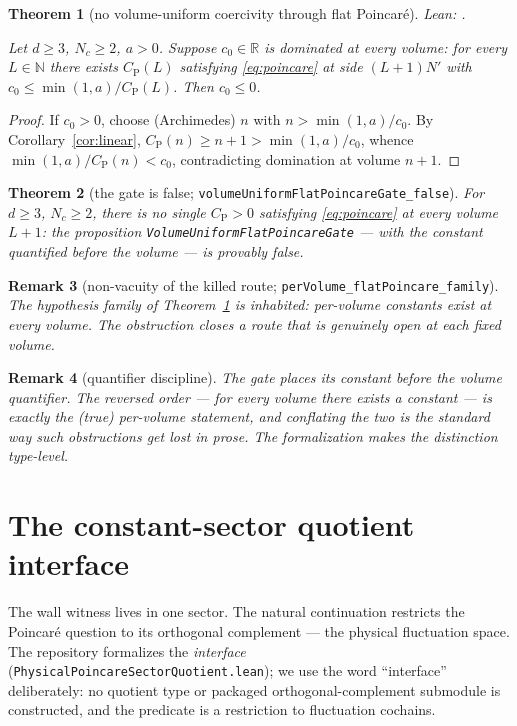 \documentclass[11pt]{article}
\newtheorem{theorem}{Theorem}[section]
\newtheorem{remark}[theorem]{Remark}
\theoremstyle{definition}
\newcommand{\lean}[1]{\texttt{#1}}
\newcommand{\R}{\mathbb{R}}
\newcommand{\CP}{C_{\mathrm{P}}}
\begin{document}
\begin{theorem}[no volume-uniform coercivity through flat Poincar\'e]
\label{thm:noc}
{\footnotesize\emph{Lean:}
.}\par
Let $d\ge3$, $N_c\ge2$, $a>0$.  Suppose $c_0\in\R$ is dominated at every
volume: for every $L\in\mathbb{N}$ there exists $\CP(L)$ satisfying
\eqref{eq:poincare} at side $(L+1)N'$ with
$c_0 \le \min(1,a)/\CP(L)$.  Then $c_0\le 0$.
\end{theorem}

\begin{proof}
If $c_0>0$, choose (Archimedes) $n$ with $n > \min(1,a)/c_0$.  By
Corollary~\ref{cor:linear}, $\CP(n)\ge n+1 > \min(1,a)/c_0$, whence
$\min(1,a)/\CP(n) < c_0$, contradicting domination at volume $n+1$.
\end{proof}

\begin{theorem}[the gate is false;
\lean{volumeUniformFlatPoincareGate\_false}]\label{thm:gatefalse}
For $d\ge3$, $N_c\ge2$, there is no single $\CP>0$ satisfying
\eqref{eq:poincare} at every volume $L+1$:
the proposition \lean{VolumeUniformFlatPoincareGate} --- with the
constant quantified \emph{before} the volume --- is provably false.
\end{theorem}

\begin{remark}[non-vacuity of the killed route;
\lean{perVolume\_flatPoincare\_family}]
The hypothesis family of Theorem~\ref{thm:noc} is inhabited: per-volume
constants exist at every volume.  The obstruction closes a route that is
genuinely open at each fixed volume.
\end{remark}

\begin{remark}[quantifier discipline]
The gate places its constant before the volume quantifier.  The reversed
order --- for every volume there exists a constant --- is exactly the
(true) per-volume statement, and conflating the two is the standard way
such obstructions get lost in prose.  The formalization makes the
distinction type-level.
\end{remark}

\section{The constant-sector quotient interface}\label{sec:quotient}

The wall witness lives in one sector.  The natural continuation
restricts the Poincar\'e question to its orthogonal complement --- the
physical fluctuation space.  The repository formalizes the
\emph{interface} (\lean{PhysicalPoincareSectorQuotient.lean}); we use
the word ``interface'' deliberately: no quotient type or packaged
orthogonal-complement submodule is constructed, and the predicate is a
restriction to fluctuation cochains.
\end{document}
